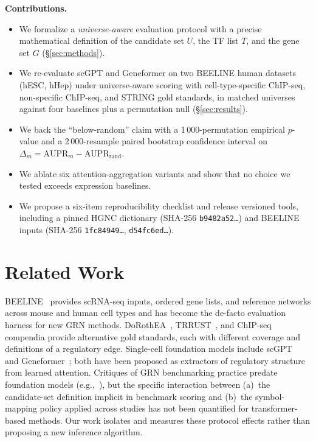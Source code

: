 \documentclass[sigconf]{acmart}
\begin{document}
\textbf{Contributions.}
\begin{itemize}
\item We formalize a \emph{universe-aware} evaluation protocol with a
precise mathematical definition of the candidate set $U$, the TF list
$T$, and the gene set $G$ (\S\ref{sec:methods}).
\item We re-evaluate scGPT and Geneformer on two BEELINE human datasets
(hESC, hHep) under universe-aware scoring with cell-type-specific
ChIP-seq, non-specific ChIP-seq, and STRING gold standards, in matched
universes against four baselines plus a permutation null
(\S\ref{sec:results}).
\item We back the ``below-random'' claim with a 1\,000-permutation
empirical $p$-value and a 2\,000-resample paired bootstrap confidence
interval on $\Delta_m = \text{AUPR}_m - \text{AUPR}_{\text{rand}}$.
\item We ablate six attention-aggregation variants and show that no
choice we tested exceeds expression baselines.
\item We propose a six-item reproducibility checklist and release
versioned tools, including a pinned HGNC dictionary
(SHA-256 \texttt{b9482a52\ldots}) and BEELINE inputs
(SHA-256 \texttt{1fc84949\ldots}, \texttt{d54fc6ed\ldots}).
\end{itemize}

\section{Related Work}

BEELINE~\cite{pratapa2020} provides scRNA-seq inputs, ordered gene
lists, and reference networks across mouse and human cell types and has
become the de-facto evaluation harness for new GRN methods.
DoRothEA~\cite{garcia2019dorothea}, TRRUST~\cite{han2018trrust}, and
ChIP-seq compendia provide alternative gold standards, each with
different coverage and definitions of a regulatory edge. Single-cell
foundation models include scGPT~\cite{cui2024scgpt} and
Geneformer~\cite{theodoris2023geneformer}; both have been proposed as
extractors of regulatory structure from learned attention. Critiques of
GRN benchmarking practice predate foundation models
(e.g.,~\cite{saelens2019, marbach2012}), but the specific interaction
between (a)~the candidate-set definition implicit in benchmark scoring
and (b)~the symbol-mapping policy applied across studies has not been
quantified for transformer-based methods. Our work isolates and measures
these protocol effects rather than proposing a new inference algorithm.
\end{document}
